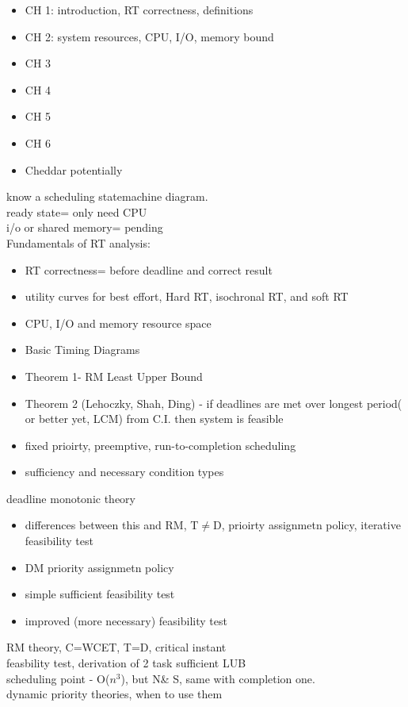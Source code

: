 \documentclass{article}
\begin{document}
\begin{itemize}
    \item CH 1: introduction, RT correctness, definitions
    \item CH 2: system resources, CPU, I/O, memory bound
    \item CH 3
    \item CH 4
    \item CH 5
    \item CH 6
    \item Cheddar potentially
\end{itemize}

know a scheduling statemachine diagram.\\
ready state= only need CPU\\
i/o or shared memory= pending\\

Fundamentals of RT analysis:
\begin{itemize}
    \item RT correctness= before deadline and correct result
    \item utility curves for best effort, Hard RT, isochronal RT, and soft RT
    \item CPU, I/O and memory resource space
    \item Basic Timing Diagrams
    \item Theorem 1- RM Least Upper Bound
    \item Theorem 2 (Lehoczky, Shah, Ding) - if deadlines are met over longest period( or better yet, LCM) from C.I. then system is feasible
    \item fixed prioirty, preemptive, run-to-completion scheduling
    \item sufficiency and necessary condition types
\end{itemize}

deadline monotonic theory
\begin{itemize}
    \item differences between this and RM, T$\neq$D, prioirty assignmetn policy, iterative feasibility test
    \item DM priority assignmetn policy
    \item simple sufficient feasibility test
    \item improved (more necessary) feasibility test
\end{itemize}

RM theory, C=WCET, T=D, critical instant\\
feasbility test, derivation of 2 task sufficient LUB\\
scheduling point - O($n^3$), but N\& S, same with completion one.\\
dynamic priority theories, when to use them\\
\end{document}
